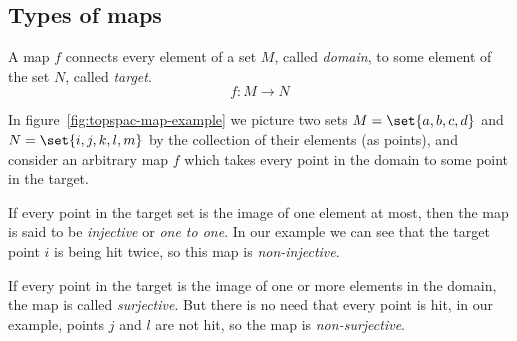   \subsection{Types of maps}
  A map $f$ connects every element of a set $M$, called \emph{domain}, to some element
  of the set $N$, called \emph{target}.
  \[
    f: M \longrightarrow N
  \]

  In figure~\ref{fig:topspac-map-example} we picture two sets $M=\set{a, b, c, d}$ and
  $N=\set{i, j, k, l, m}$ by the collection of their elements (as points), and consider an arbitrary map
  $f$ which takes every point in the domain to some point in the target.
  
  If every point in the target set is the image of one element at most, then the map is said to be
  \emph{injective} or \emph{one to one}. In our example we can see that the target point $i$ is being hit
  twice, so this map is \emph{non-injective}.

  If every point in the target is the image of one or more elements in the
  domain, the map is called \emph{surjective}. But there is no need that every point is hit,
  in our example, points $j$ and $l$ are not hit, so the map is \emph{non-surjective}.

